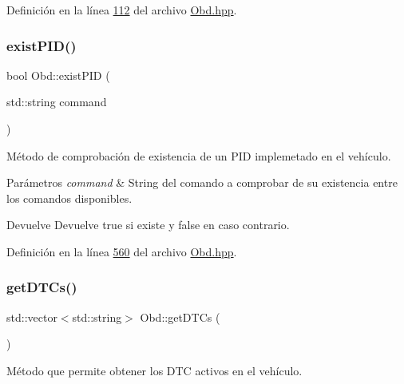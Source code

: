 Definición en la línea \hyperlink{Obd_8hpp_source_l00112}{112} del archivo \hyperlink{Obd_8hpp_source}{Obd.\+hpp}.

\mbox{\label{classObd_aeff55ecb0a0a4278a22f20db3d2e17e3}} 
\subsubsection{\texorpdfstring{exist\+P\+I\+D()}{existPID()}}
{\footnotesize\ttfamily bool Obd\+::exist\+P\+ID (\begin{DoxyParamCaption}\item[{std\+::string}]{command }\end{DoxyParamCaption})\hspace{0.3cm}{\ttfamily [inline]}}



Método de comprobación de existencia de un P\+ID implemetado en el vehículo. 


\begin{DoxyParams}{Parámetros}
{\em command} & String del comando a comprobar de su existencia entre los comandos disponibles. \\
\hline
\end{DoxyParams}
\begin{DoxyReturn}{Devuelve}
Devuelve true si existe y false en caso contrario. 
\end{DoxyReturn}


Definición en la línea \hyperlink{Obd_8hpp_source_l00560}{560} del archivo \hyperlink{Obd_8hpp_source}{Obd.\+hpp}.

\mbox{\label{classObd_ac57afb9228d933c6be5b2fa8e6446036}} 
\subsubsection{\texorpdfstring{get\+D\+T\+Cs()}{getDTCs()}}
{\footnotesize\ttfamily std\+::vector$<$std\+::string$>$ Obd\+::get\+D\+T\+Cs (\begin{DoxyParamCaption}{ }\end{DoxyParamCaption})\hspace{0.3cm}{\ttfamily [inline]}}



Método que permite obtener los D\+TC activos en el vehículo. 


